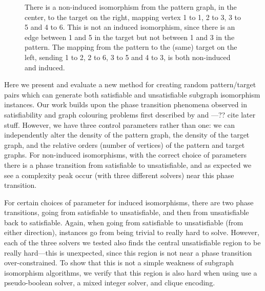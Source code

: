\documentclass[letterpaper]{article}
\begin{document}
\begin{figure}[b]

    \caption{There is a non-induced isomorphism from the pattern graph, in the center, to the target
    on the right, mapping vertex 1 to 1, 2 to 3, 3 to 5 and 4 to 6. This is not an induced
    isomorphism, since there is an edge between 1 and 5 in the target but not between 1 and 3 in the
    pattern. The mapping from the pattern to the (same) target on the left, sending 1 to 2, 2 to 6, 3 to
    5 and 4 to 3, is both non-induced and induced.}
    \label{figure:sip}
\end{figure}

Here we present and evaluate a new method for creating random pattern/target pairs which can
generate both satisfiable and unsatisfiable subgraph isomorphism instances. Our work builds upon the
phase transition phenomena observed in satisfiability and graph colouring problems first described
by \citet{Cheeseman:1991} and \citet{Mitchell:1992}---?? cite later stuff. However, we have three
control parameters rather than one: we can independently alter the density of the pattern graph, the
density of the target graph, and the relative orders (number of vertices) of the pattern and target
graphs.  For non-induced isomorphisms, with the correct choice of parameters there is a phase
transition from satisfiable to unsatisfiable, and as expected we see a complexity peak occur (with
three different solvers) near this phase transition.

For certain choices of parameter for induced isomorphisms, there are two phase transitions, going
from satisfiable to unsatisfiable, and then from unsatisfiable back to satisfiable. Again, when
going from satisfiable to unsatisfiable (from either direction), instances go from being trivial to
really hard to solve. However, each of the three solvers we tested also finds the central
unsatisfiable region to be really hard---this is unexpected, since this region is not near a phase
transition over-constrained. To show that this is not a simple weakness of subgraph isomorphism
algorithms, we verify that this region is also hard when using use a pseudo-boolean solver, a mixed
integer solver, and clique encoding.
\end{document}
